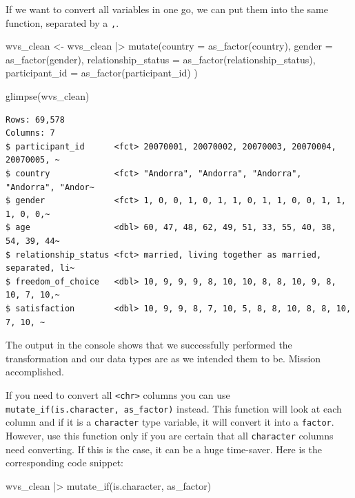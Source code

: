 \documentclass[
  letterpaper,
]{krantz}
\makeatletter
\newenvironment{Shaded}{\begin{snugshade}}{\end{snugshade}}
\newcommand{\AttributeTok}[1]{\textcolor[rgb]{0.40,0.45,0.13}{#1}}
\newcommand{\FunctionTok}[1]{\textcolor[rgb]{0.28,0.35,0.67}{#1}}
\newcommand{\NormalTok}[1]{\textcolor[rgb]{0.00,0.23,0.31}{#1}}
\newcommand{\OtherTok}[1]{\textcolor[rgb]{0.00,0.23,0.31}{#1}}
\newcommand{\SpecialCharTok}[1]{\textcolor[rgb]{0.37,0.37,0.37}{#1}}
\newenvironment{kframe}{%
\medskip{}
\setlength{\fboxsep}{.8em}
 \def\at@end@of@kframe{}%
 \ifinner\ifhmode%
  \def\at@end@of@kframe{\end{minipage}}%
  \begin{minipage}{\columnwidth}%
 \fi\fi%
 \def\FrameCommand##1{\hskip\@totalleftmargin \hskip-\fboxsep
 \colorbox{shadecolor}{##1}\hskip-\fboxsep
     \hskip-\linewidth \hskip-\@totalleftmargin \hskip\columnwidth}%
 \MakeFramed {\advance\hsize-\width
   \@totalleftmargin\z@ \linewidth\hsize
   \@setminipage}}%
 {\par\unskip\endMakeFramed%
 \at@end@of@kframe}
\renewenvironment{Shaded}{\begin{kframe}}{\end{kframe}}
\makeatother
\begin{document}
If we want to convert all variables in one go, we can put them into the
same function, separated by a \texttt{,}.

\begin{Shaded}
\begin{Highlighting}[]
\NormalTok{wvs\_clean }\OtherTok{\textless{}{-}}
\NormalTok{  wvs\_clean }\SpecialCharTok{|\textgreater{}}
  \FunctionTok{mutate}\NormalTok{(}\AttributeTok{country =} \FunctionTok{as\_factor}\NormalTok{(country),}
         \AttributeTok{gender =} \FunctionTok{as\_factor}\NormalTok{(gender),}
         \AttributeTok{relationship\_status =} \FunctionTok{as\_factor}\NormalTok{(relationship\_status),}
         \AttributeTok{participant\_id =} \FunctionTok{as\_factor}\NormalTok{(participant\_id)}
\NormalTok{         )}

\FunctionTok{glimpse}\NormalTok{(wvs\_clean)}
\end{Highlighting}
\end{Shaded}

\begin{verbatim}
Rows: 69,578
Columns: 7
$ participant_id      <fct> 20070001, 20070002, 20070003, 20070004, 20070005, ~
$ country             <fct> "Andorra", "Andorra", "Andorra", "Andorra", "Andor~
$ gender              <fct> 1, 0, 0, 1, 0, 1, 1, 0, 1, 1, 0, 0, 1, 1, 1, 0, 0,~
$ age                 <dbl> 60, 47, 48, 62, 49, 51, 33, 55, 40, 38, 54, 39, 44~
$ relationship_status <fct> married, living together as married, separated, li~
$ freedom_of_choice   <dbl> 10, 9, 9, 9, 8, 10, 10, 8, 8, 10, 9, 8, 10, 7, 10,~
$ satisfaction        <dbl> 10, 9, 9, 8, 7, 10, 5, 8, 8, 10, 8, 8, 10, 7, 10, ~
\end{verbatim}

The output in the console shows that we successfully performed the
transformation and our data types are as we intended them to be. Mission
accomplished.

If you need to convert all \texttt{\textless{}chr\textgreater{}} columns
you can use \texttt{mutate\_if(is.character,\ as\_factor)} instead. This
function will look at each column and if it is a \texttt{character} type
variable, it will convert it into a \texttt{factor}. However, use this
function only if you are certain that all \texttt{character} columns
need converting. If this is the case, it can be a huge time-saver. Here
is the corresponding code snippet:

\begin{Shaded}
\begin{Highlighting}[]
\NormalTok{wvs\_clean }\SpecialCharTok{|\textgreater{}}
  \FunctionTok{mutate\_if}\NormalTok{(is.character, as\_factor)}
\end{Highlighting}
\end{Shaded}
\end{document}
